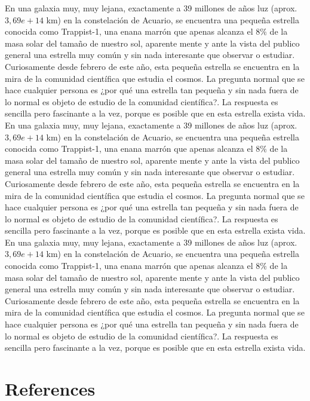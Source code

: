 \documentclass[3p,times]{elsarticle}
\begin{document}
En una galaxia muy, muy lejana, exactamente a 39 millones de años luz (aprox. $3,69e+14$ km) en la constelación de Acuario, se encuentra una pequeña estrella conocida como Trappist-1, una enana marrón  que apenas alcanza el  $8\%$ de la masa solar del tamaño de nuestro sol, aparente mente y ante la vista del publico general una estrella muy común y sin nada interesante que observar o estudiar.  Curiosamente desde febrero de este año, esta pequeña estrella se encuentra en la mira de la comunidad científica que estudia el cosmos. La pregunta normal que se hace cualquier persona es ¿por qué una estrella tan pequeña y sin nada fuera de lo normal es objeto de estudio de la comunidad científica?. La respuesta es sencilla pero fascinante a la vez, porque es posible que en esta estrella exista vida.
En una galaxia muy, muy lejana, exactamente a 39 millones de años luz (aprox. $3,69e+14$ km) en la constelación de Acuario, se encuentra una pequeña estrella conocida como Trappist-1, una enana marrón  que apenas alcanza el  $8\%$ de la masa solar del tamaño de nuestro sol, aparente mente y ante la vista del publico general una estrella muy común y sin nada interesante que observar o estudiar.  Curiosamente desde febrero de este año, esta pequeña estrella se encuentra en la mira de la comunidad científica que estudia el cosmos. La pregunta normal que se hace cualquier persona es ¿por qué una estrella tan pequeña y sin nada fuera de lo normal es objeto de estudio de la comunidad científica?. La respuesta es sencilla pero fascinante a la vez, porque es posible que en esta estrella exista vida.
En una galaxia muy, muy lejana, exactamente a 39 millones de años luz (aprox. $3,69e+14$ km) en la constelación de Acuario, se encuentra una pequeña estrella conocida como Trappist-1, una enana marrón  que apenas alcanza el  $8\%$ de la masa solar del tamaño de nuestro sol, aparente mente y ante la vista del publico general una estrella muy común y sin nada interesante que observar o estudiar.  Curiosamente desde febrero de este año, esta pequeña estrella se encuentra en la mira de la comunidad científica que estudia el cosmos. La pregunta normal que se hace cualquier persona es ¿por qué una estrella tan pequeña y sin nada fuera de lo normal es objeto de estudio de la comunidad científica?. La respuesta es sencilla pero fascinante a la vez, porque es posible que en esta estrella exista vida.

\section*{References}



\end{document}
